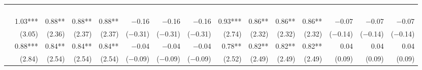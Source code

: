     \begin{tabularx}{1.45\textwidth}{lRRRRRRRRRRRRRR}
        \toprule
        &  &  \\ \cmidrule(rl){2-8} \cmidrule(rl){9-15}
        &  &  &  &  \\
        \cmidrule(rl){2-5} \cmidrule(rl){6-8} \cmidrule(rl){9-12} \cmidrule(rl){13-15}
        &  &  &  &  &  &  &  &  &  &  &  &  &  &  \\
		\midrule
		 \\[\panelspacing]
		 & \num{1.03}***\phantom{)} & \num{0.88}**\phantom{*)} & \num{0.88}**\phantom{*)} & \num{0.88}**\phantom{*)} & \num{-0.16}\phantom{***)} & \num{-0.16}\phantom{***)} & \num{-0.16}\phantom{***)} & \num{0.93}***\phantom{)} & \num{0.86}**\phantom{*)} & \num{0.86}**\phantom{*)} & \num{0.86}**\phantom{*)} & \num{-0.07}\phantom{***)} & \num{-0.07}\phantom{***)} & \num{-0.07}\phantom{***)} \\
		 & (\num{3.05})\phantom{***} & (\num{2.36})\phantom{***} & (\num{2.37})\phantom{***} & (\num{2.37})\phantom{***} & (\num{-0.31})\phantom{***} & (\num{-0.31})\phantom{***} & (\num{-0.31})\phantom{***} & (\num{2.74})\phantom{***} & (\num{2.32})\phantom{***} & (\num{2.32})\phantom{***} & (\num{2.32})\phantom{***} & (\num{-0.14})\phantom{***} & (\num{-0.14})\phantom{***} & (\num{-0.14})\phantom{***} \\ [\dspacing]
		 & \num{0.88}***\phantom{)} & \num{0.84}**\phantom{*)} & \num{0.84}**\phantom{*)} & \num{0.84}**\phantom{*)} & \num{-0.04}\phantom{***)} & \num{-0.04}\phantom{***)} & \num{-0.04}\phantom{***)} & \num{0.78}**\phantom{*)} & \num{0.82}**\phantom{*)} & \num{0.82}**\phantom{*)} & \num{0.82}**\phantom{*)} & \num{0.04}\phantom{***)} & \num{0.04}\phantom{***)} & \num{0.04}\phantom{***)} \\
		 & (\num{2.84})\phantom{***} & (\num{2.54})\phantom{***} & (\num{2.54})\phantom{***} & (\num{2.54})\phantom{***} & (\num{-0.09})\phantom{***} & (\num{-0.09})\phantom{***} & (\num{-0.09})\phantom{***} & (\num{2.52})\phantom{***} & (\num{2.49})\phantom{***} & (\num{2.49})\phantom{***} & (\num{2.49})\phantom{***} & (\num{0.09})\phantom{***} & (\num{0.09})\phantom{***} & (\num{0.09})\phantom{***} \\ [\dspacing]

\end{tabularx}
